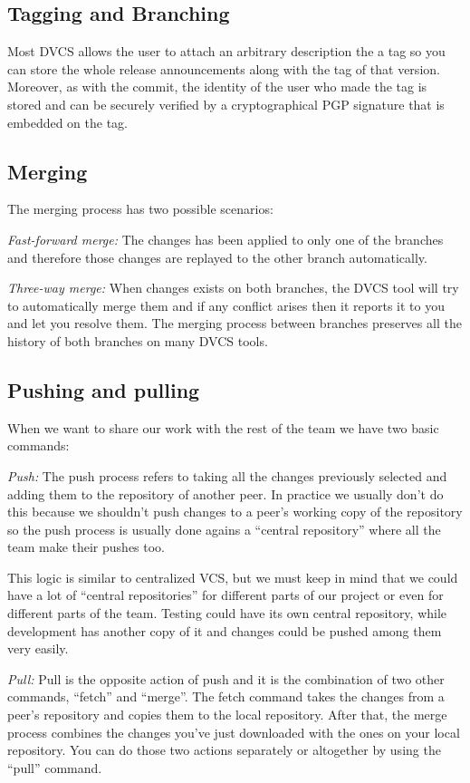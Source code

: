 \subsection{Tagging and Branching}
Most DVCS allows the user to attach an arbitrary description the a tag so you can store the whole release announcements along with the tag of that version. Moreover, as with the commit, the identity of the user who made the tag is stored and can be securely verified by a cryptographical PGP signature that is embedded on the tag.

\subsection{Merging}
The merging process has two possible scenarios:

\emph{Fast-forward merge:} The changes has been applied to only one of the branches and therefore those changes are replayed to the other branch automatically.

\emph{Three-way merge:} When changes exists on both branches, the DVCS tool will try to automatically merge them and if any conflict arises then it reports it to you and let you resolve them. 
The merging process\cite{svnmerging} between branches preserves all the history of 
both branches on many DVCS tools.

\subsection{Pushing and pulling}
When we want to share our work with the rest of the team we have two basic commands:

\emph{Push:}
The push process refers to taking all the changes previously selected and adding them to the repository of another peer. In practice we usually don't do this because we shouldn't push changes to a peer's working copy of the repository so the push process is usually done agains a ``central repository'' where all the team make their pushes too. 

This logic is similar to centralized VCS, but we must keep in mind that we could have a lot of ``central repositories'' for different parts of our project or even for different parts of the team. Testing could have its own central repository, while development has another copy of it and changes could be pushed among them very easily.

\emph{Pull:} 
Pull is the opposite action of push and it is the combination of two other commands, ``fetch'' and ``merge''. The fetch command takes the changes from a peer's repository and copies them to the local repository. After that, the merge process combines the changes you've just downloaded with the ones on your local repository. You can do those two actions separately or altogether by using the ``pull'' command.

